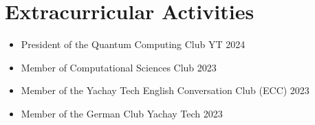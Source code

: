 \documentclass[a4paper,12pt]{article}
\begin{document}
\begin{comment}
\begin{refsection}[citations.bib]
\nocite{*}
\printbibliography[heading=none]
\end{refsection}
\end{comment}


\section{Extracurricular Activities}
\begin{itemize}
    \item President of the Quantum Computing Club YT \hfill {2024}
    \item Member of Computational Sciences Club \hfill {2023}
    \item Member of the Yachay Tech English Conversation Club (ECC) \hfill {2023}
    \item Member of the German Club Yachay Tech \hfill {2023}
\end{itemize}

\vfill
{}
\end{document}
